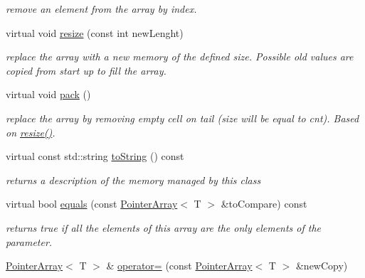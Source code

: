 \begin{DoxyCompactItemize}
\begin{DoxyCompactList}\small\item\em remove an element from the array by index. \end{DoxyCompactList}\item 
\hypertarget{classparray_1_1PointerArray_a6d4347a899d2783d23775957ad71f743}{virtual void \hyperlink{classparray_1_1PointerArray_a6d4347a899d2783d23775957ad71f743}{resize} (const int new\-Lenght)}\label{classparray_1_1PointerArray_a6d4347a899d2783d23775957ad71f743}

\begin{DoxyCompactList}\small\item\em replace the array with a new memory of the defined size. Possible old values are copied from start up to fill the array. \end{DoxyCompactList}\item 
\hypertarget{classparray_1_1PointerArray_a13883fc7ef994a50a83ae3f9ddc4db27}{virtual void \hyperlink{classparray_1_1PointerArray_a13883fc7ef994a50a83ae3f9ddc4db27}{pack} ()}\label{classparray_1_1PointerArray_a13883fc7ef994a50a83ae3f9ddc4db27}

\begin{DoxyCompactList}\small\item\em replace the array by removing empty cell on tail (size will be equal to cnt). Based on \hyperlink{classparray_1_1PointerArray_a6d4347a899d2783d23775957ad71f743}{resize()}. \end{DoxyCompactList}\item 
\hypertarget{classparray_1_1PointerArray_a4c6e34cad01f5f72dd6c5de917ed3a34}{virtual const std\-::string \hyperlink{classparray_1_1PointerArray_a4c6e34cad01f5f72dd6c5de917ed3a34}{to\-String} () const }\label{classparray_1_1PointerArray_a4c6e34cad01f5f72dd6c5de917ed3a34}

\begin{DoxyCompactList}\small\item\em returns a description of the memory managed by this class \end{DoxyCompactList}\item 
\hypertarget{classparray_1_1PointerArray_a2ca07f329b7568d2bdd4ea50ba153a2b}{virtual bool \hyperlink{classparray_1_1PointerArray_a2ca07f329b7568d2bdd4ea50ba153a2b}{equals} (const \hyperlink{classparray_1_1PointerArray}{Pointer\-Array}$<$ T $>$ \&to\-Compare) const }\label{classparray_1_1PointerArray_a2ca07f329b7568d2bdd4ea50ba153a2b}

\begin{DoxyCompactList}\small\item\em returns true if all the elements of this array are the only elements of the parameter. \end{DoxyCompactList}\item 
\hypertarget{classparray_1_1PointerArray_acc9c164599807ed762727667f6b6bf13}{\hyperlink{classparray_1_1PointerArray}{Pointer\-Array}$<$ T $>$ \& \hyperlink{classparray_1_1PointerArray_acc9c164599807ed762727667f6b6bf13}{operator=} (const \hyperlink{classparray_1_1PointerArray}{Pointer\-Array}$<$ T $>$ \&new\-Copy)}\label{classparray_1_1PointerArray_acc9c164599807ed762727667f6b6bf13}


\end{DoxyCompactItemize}
